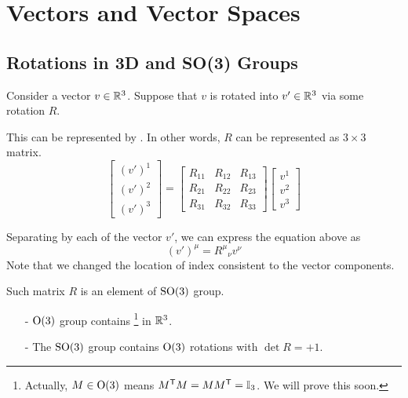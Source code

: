 \documentclass[a4paper, 10pt]{article}
\begin{document}
\section{Vectors and Vector Spaces}
\setcounter{subsection}{2}

\subsection{Rotations in 3D and SO(3) Groups}
\setcounter{theorem}{18}

\begin{example}
    Consider a vector $v \in \mathbb{R}^{3}$. Suppose that $v$ is rotated into $v' \in \mathbb{R}^{3}$ via some rotation $R$.

    This can be represented by . In other words, $R$ can be represented as $3 \times 3$ matrix.
    \[ \begin{bmatrix}(v')^{1} \\ (v')^{2} \\ (v')^{3}\end{bmatrix} = \begin{bmatrix}
        R_{11} & R_{12} & R_{13} \\ R_{21} & R_{22} & R_{23} \\ R_{31} & R_{32} & R_{33}
    \end{bmatrix}\begin{bmatrix}v^{1} \\ v^{2} \\ v^{3}\end{bmatrix} \]

    Separating by each  of the vector $v'$, we can express the equation above as
    \[ (v')^{\mu} = R^{\mu}{}_{\nu} v^{\nu} \]
    Note that we changed the location of index consistent to the vector components.

    Such matrix $R$ is an element of $\mathrm{SO(3)}$ group.
    \begin{itemize}
        \item[-] $\mathrm{O(3)}$ group contains \footnote{Actually, $M \in \mathrm{O(3)}$ means $M^{\mathsf{T}}M = MM^{\mathsf{T}} = \mathbb{I}_{3}$. We will prove this soon.} in $\mathbb{R}^{3}$.
        \item[-] The $\mathrm{SO(3)}$ group contains $\mathrm{O}(3)$ rotations with $\det R = +1$.
    \end{itemize}
\end{example}

\seprule
\end{document}
